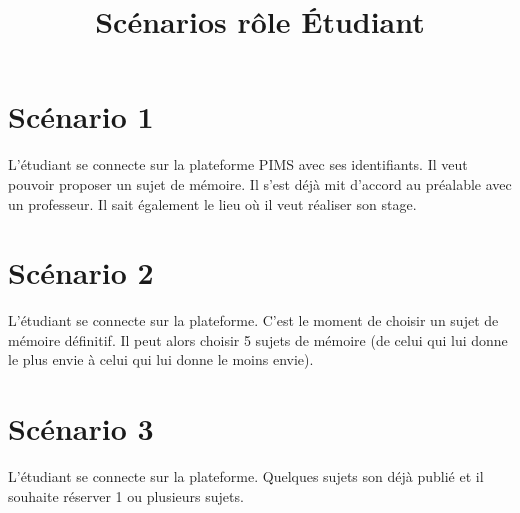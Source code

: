 \documentclass[a4paper, 11pt]{article}
\title{Scénarios rôle \bf \'Etudiant}
\author{}
\begin{document}
\maketitle

\section*{Scénario 1}
L'étudiant se connecte sur la plateforme PIMS avec ses identifiants. Il veut pouvoir proposer un sujet de mémoire. Il s'est déjà mit d'accord au préalable avec un professeur. Il sait également le lieu où il veut réaliser son stage.

\section*{Scénario 2}
L'étudiant se connecte sur la plateforme. C'est le moment de choisir un sujet de mémoire définitif. Il peut alors choisir 5 sujets de mémoire (de celui qui lui donne le plus envie à celui qui lui donne le moins envie).

\section*{Scénario 3}
L'étudiant se connecte sur la plateforme. Quelques sujets son déjà publié et il souhaite réserver 1 ou plusieurs sujets.
\end{document}
